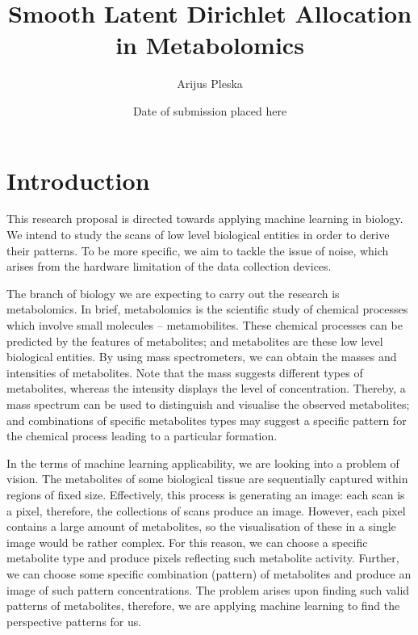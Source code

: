 \documentclass{mprop}
\begin{document}
\title{Smooth Latent Dirichlet Allocation in Metabolomics}
\author{Arijus Pleska}
\date{Date of submission placed here}
\maketitle

\tableofcontents
\newpage

\section{Introduction}\label{intro}

\par This research proposal is directed towards applying machine learning in biology. We intend to study the scans of low level biological entities in order to derive their patterns. To be more specific, we aim to tackle the issue of noise, which arises from the hardware limitation of the data collection devices.   

\par The branch of biology we are expecting to carry out the research is metabolomics. In brief, metabolomics is the scientific study of chemical processes which involve small molecules -- metamobilites. These chemical processes can be predicted by the features of metabolites; and metabolites are these low level biological entities. By using mass spectrometers, we can obtain the masses and intensities of metabolites. Note that the mass suggests different types of metabolites, whereas the intensity displays the level of concentration. Thereby, a mass spectrum can be used to distinguish and visualise the observed metabolites; and combinations of specific metabolites types   may suggest a specific pattern for the chemical process leading to a particular formation. 

\par In the terms of machine learning applicability, we are looking into a problem of vision. The metabolites of some biological tissue are sequentially captured within regions of fixed size. Effectively, this process is generating an image: each scan is a pixel, therefore, the collections of scans produce an image. However, each pixel contains a large amount of metabolites, so the visualisation of these in a single image would be rather complex. For this reason, we can choose a specific metabolite type and produce pixels reflecting such metabolite activity. Further, we can choose some specific combination (pattern) of metabolites and produce an image of such pattern concentrations. The problem arises upon finding such valid patterns of metabolites, therefore, we are applying machine learning to find the perspective patterns for us. 
\end{document}
